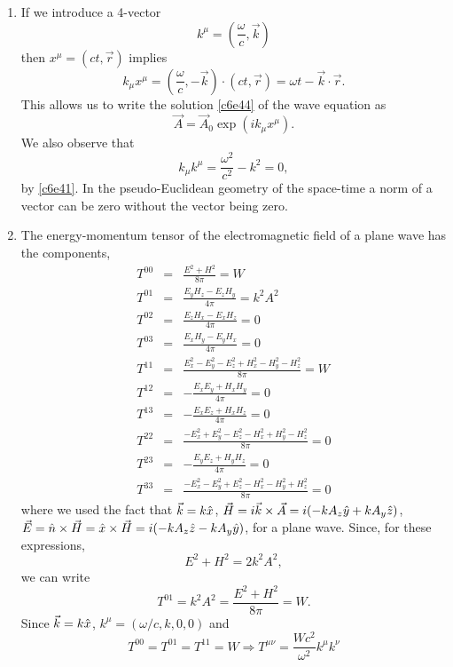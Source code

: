 \begin{enumerate}
\item If we introduce a 4-vector
\begin{equation}\label{c6e54}
k^\mu = \left(\frac{\omega}{c}, \vec{k}\right)
\end{equation}
then $x^\mu = (ct, \vec{r})$ implies
\begin{equation}\label{c6e55}
k_\mu x^\mu = \left(\frac{\omega}{c}, -\vec{k}\right)\cdot(ct, \vec{r})
= \omega t - \vec{k}\cdot\vec{r}.
\end{equation}
This allows us to write the solution \eqref{c6e44} of the wave equation as 
\begin{equation}\label{c6e56}
\vec{A} = \vec{A}_0\exp(ik_\mu x^\mu).
\end{equation}
We also observe that
\begin{equation}\label{c6e57}
k_\mu k^\mu = \frac{\omega^2}{c^2} - k^2 = 0,
\end{equation}
by \eqref{c6e41}. In the pseudo-Euclidean geometry of the space-time a norm of a
vector can be zero without the vector being zero.

\item The energy-momentum tensor of the electromagnetic field of a plane wave 
has the components,
\begin{eqnarray*}
T^{00} &=& \frac{E^2 + H^2}{8\pi} = W \\
T^{01} &=& \frac{E_yH_z - E_zH_y}{4\pi} = k^2A^2\\
T^{02} &=& \frac{E_zH_x - E_xH_z}{4\pi} = 0 \\
T^{03} &=& \frac{E_xH_y - E_yH_x}{4\pi} = 0 \\
T^{11} &=& \frac{E_x^2 - E_y^2 - E_z^2 + H_x^2 - H_y^2 - H_z^2}{8\pi} = W \\
T^{12} &=& -\frac{E_xE_y + H_xH_y}{4\pi} = 0\\
T^{13} &=& -\frac{E_xE_z + H_xH_z}{4\pi} = 0\\
T^{22} &=& \frac{-E_x^2 + E_y^2 - E_z^2 - H_x^2 + H_y^2 - H_z^2}{8\pi} = 0\\
T^{23} &=& -\frac{E_yE_z + H_yH_z}{4\pi} = 0 \\
T^{33} &=& \frac{-E_x^2 - E_y^2 + E_z^2 - H_x^2 - H_y^2 + H_z^2}{8\pi} = 0
\end{eqnarray*}
where we used the fact that $\vec{k} = k\hat{x}$, $\vec{H} = 
i\vec{k}\times\vec{A} = i(-kA_z\hat{y} + kA_y\hat{z})$, $\vec{E} = 
\hat{n}\times\vec{H} = \hat{x}\times\vec{H}
= i(-kA_z\hat{z} - kA_y\hat{y})$, for a plane wave. Since, for these expressions,
\[
E^2 + H^2 = 2k^2A^2,
\]
we can write
\begin{equation}\label{c6e58}
T^{01} = k^2A^2 = \frac{E^2 + H^2}{8\pi} = W.
\end{equation}
Since $\vec{k} = k\hat{x}$, $k^\mu = (\omega/c, k, 0, 0)$ and
\begin{equation}\label{c6e59}
T^{00} = T^{01} = T^{11} = W \Rightarrow T^{\mu\nu} = 
\frac{Wc^2}{\omega^2}k^\mu k^\nu
\end{equation}


\end{enumerate}
